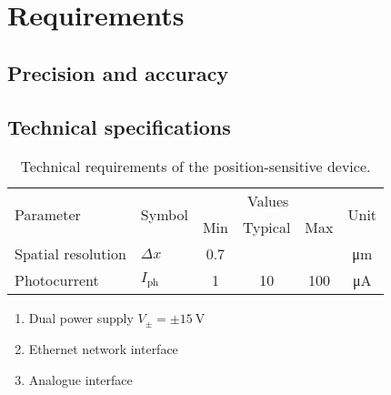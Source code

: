 \section{Requirements}

\subsection{Precision and accuracy}

\subsection{Technical specifications}

\begin{table}[H]
	\centering
	\begin{tabular}{llcccc}
		\toprule
			\multirow{2}[3]{*}{Parameter} &
			\multirow{2}[3]{*}{Symbol} &
			\multicolumn{3}{c}{Values} &
			\multirow{2}[3]{*}{Unit} \\
			\cmidrule(lr){3-4} & & Min & Typical & Max & \\
		\midrule
			Spatial resolution & $\Delta x$ & \num{0.7} & & & \si{\micro\meter} \\
			Photocurrent & $I_\text{ph}$ & \num{1} & \num{10} & \num{100} & \si{\micro\ampere} \\
		\bottomrule
	\end{tabular}
	\caption{Technical requirements of the position-sensitive device.}
\end{table}

\begin{enumerate}
    \item Dual power supply $V_\pm=\pm\SI{15}{\volt}$
    \item Ethernet network interface
    \item Analogue interface
\end{enumerate}
